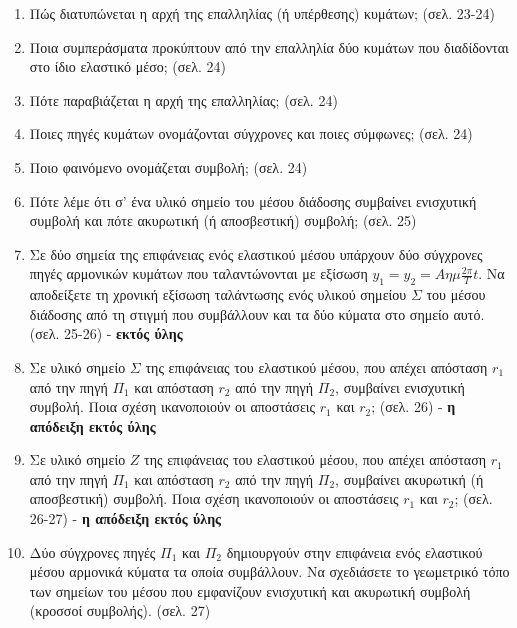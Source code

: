 \documentclass{article}
\begin{document}
\begin{enumerate}
      \item Πώς διατυπώνεται η αρχή της επαλληλίας (ή υπέρθεσης) κυμάτων; (σελ. 23-24)

      \item Ποια συμπεράσματα προκύπτουν από την επαλληλία δύο κυμάτων που διαδίδονται στο ίδιο ελαστικό μέσο; (σελ. 24)

      \item Πότε παραβιάζεται η αρχή της επαλληλίας; (σελ. 24)

      \item Ποιες πηγές κυμάτων ονομάζονται σύγχρονες και ποιες σύμφωνες; (σελ. 24)

      \item Ποιο φαινόμενο ονομάζεται συμβολή; (σελ. 24)

      \item Πότε λέμε ότι σ' ένα υλικό σημείο του μέσου διάδοσης συμβαίνει ενισχυτική συμβολή και πότε ακυρωτική (ή αποσβεστική) συμβολή; (σελ. 25)

      \item Σε δύο σημεία της επιφάνειας ενός ελαστικού μέσου υπάρχουν δύο σύγχρονες πηγές αρμονικών κυμάτων που ταλαντώνονται με εξίσωση $y_1 = y_2 = A\eta\mu\frac{2\pi}{T}t$. Να αποδείξετε τη χρονική εξίσωση ταλάντωσης ενός υλικού σημείου $\Sigma$ του μέσου διάδοσης από τη στιγμή που συμβάλλουν και τα δύο κύματα στο σημείο αυτό. (σελ. 25-26) - \textbf{εκτός ύλης}

      \item Σε υλικό σημείο $\Sigma$ της επιφάνειας του ελαστικού μέσου, που απέχει απόσταση $r_1$ από την πηγή $\Pi_1$ και απόσταση $r_2$ από την πηγή $\Pi_2$, συμβαίνει ενισχυτική συμβολή. Ποια σχέση ικανοποιούν οι αποστάσεις $r_1$ και $r_2$; (σελ. 26) - \textbf{η απόδειξη εκτός ύλης}

      \item Σε υλικό σημείο $Z$ της επιφάνειας του ελαστικού μέσου, που απέχει απόσταση $r_1$ από την πηγή $\Pi_1$ και απόσταση $r_2$ από την πηγή $\Pi_2$, συμβαίνει ακυρωτική (ή αποσβεστική) συμβολή. Ποια σχέση ικανοποιούν οι αποστάσεις $r_1$ και $r_2$; (σελ. 26-27) - \textbf{η απόδειξη εκτός ύλης}

      \item Δύο σύγχρονες πηγές $\Pi_1$ και $\Pi_2$ δημιουργούν στην επιφάνεια ενός ελαστικού μέσου αρμονικά κύματα τα οποία συμβάλλουν. Να σχεδιάσετε το γεωμετρικό τόπο των σημείων του μέσου που εμφανίζουν ενισχυτική και ακυρωτική συμβολή (κροσσοί συμβολής). (σελ. 27)
\end{enumerate}
\end{document}
